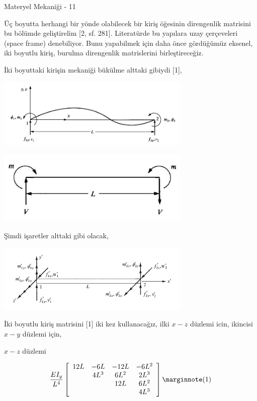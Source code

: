 \documentclass[12pt,fleqn]{article}\usepackage{../../common}
\begin{document}
Materyel Mekaniği - 11

Üç boyutta herhangi bir yönde olabilecek bir kiriş öğesinin direngenlik
matrisini bu bölümde geliştirelim [2, sf. 281]. Literatürde bu yapılara uzay
çerçeveleri (space frame) denebiliyor. Bunu yapabilmek için daha önce gördüğümüz
eksenel, iki boyutlu kiriş, burulma direngenlik matrislerini birleştireceğiz.

İki boyuttaki kirişin mekaniği bükülme alttaki gibiydi [1],

\includegraphics[width=25em]{phy_020_strs_11_02.jpg}

\includegraphics[width=25em]{phy_020_strs_11_03.jpg}

Şimdi işaretler alttaki gibi olacak,

\includegraphics[width=25em]{phy_020_strs_11_01.jpg}

İki boyutlu kiriş matrisini [1] iki kez kullanacağız, ilki $x-z$ düzlemi icin,
ikincisi $x-y$ düzlemi için,

$x-z$ düzlemi

$$
\frac{EI_y}{L^4}
\left[\begin{array}{cccc}
12L & -6L  & -12L & -6L^2 \\
    & 4L^3 & 6L^2 & 2L^3  \\
    &      & 12L  & 6L^2  \\
    &      &      & 4L^3
\end{array}\right]
\mlabel{1}
$$
\end{document}
